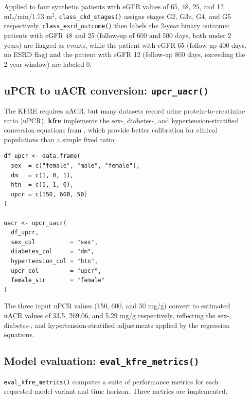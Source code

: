 Applied to four synthetic patients with eGFR values of 65, 48, 25, and
12 mL/min/1.73 m\(^2\), \texttt{class\_ckd\_stages()} assigns stages G2, G3a, G4, and G5
respectively. \texttt{class\_esrd\_outcome()} then labels the 2-year binary outcome:
patients with eGFR 48 and 25 (follow-up of 600 and 500 days, both under 2 years)
are flagged as events, while the patient with eGFR 65 (follow-up 400 days, no
ESRD flag) and the patient with eGFR 12 (follow-up 800 days, exceeding the
2-year window) are labeled 0.

\subsection{\texorpdfstring{uPCR to uACR conversion: \texttt{upcr\_uacr()}}{uPCR to uACR conversion: upcr\_uacr()}}\label{upcr-to-uacr-conversion-upcr_uacr}

The KFRE requires uACR, but many datasets record urine protein-to-creatinine
ratio (uPCR). \textbf{kfre} implements the sex-, diabetes-, and
hypertension-stratified conversion equations from \citet{sumida2020}, which provide
better calibration for clinical populations than a simple fixed ratio:

\begin{verbatim}
df_upcr <- data.frame(
  sex  = c("female", "male", "female"),
  dm   = c(1, 0, 1),
  htn  = c(1, 1, 0),
  upcr = c(150, 600, 50)
)

uacr <- upcr_uacr(
  df_upcr,
  sex_col          = "sex",
  diabetes_col     = "dm",
  hypertension_col = "htn",
  upcr_col         = "upcr",
  female_str       = "female"
)
\end{verbatim}

The three input uPCR values (150, 600, and 50 mg/g) convert to estimated uACR
values of 33.5, 269.06, and
5.29 mg/g respectively, reflecting the sex-, diabetes-, and
hypertension-stratified adjustments applied by the \citet{sumida2020} regression
equations.

\subsection{\texorpdfstring{Model evaluation: \texttt{eval\_kfre\_metrics()}}{Model evaluation: eval\_kfre\_metrics()}}\label{model-evaluation-eval_kfre_metrics}

\texttt{eval\_kfre\_metrics()} computes a suite of performance metrics for each
requested model variant and time horizon. Three metrics are implemented.

